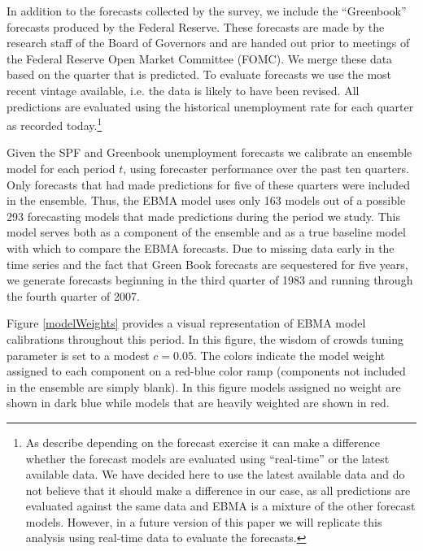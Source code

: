\documentclass[12pt,fullpage,endnotes]{article}
\begin{document}
In addition to the forecasts collected by the survey, we include the ``Greenbook'' forecasts produced by the Federal Reserve. These forecasts are made by the research staff of the Board of Governors and are handed out prior to meetings of the Federal Reserve Open Market Committee (FOMC). We merge these data based on the quarter that is predicted. To evaluate forecasts we use the most recent vintage available, i.e. the data is likely to have been revised. All predictions are evaluated using the historical unemployment rate for each quarter as recorded today.\footnote{As \citet{Croushore:Stark:2001} describe depending on the forecast exercise it can make a difference whether the forecast models are evaluated using ``real-time'' or the latest available data. We have decided here to use the latest available data and do not believe that it should make a difference in our case, as all predictions are evaluated against the same data and EBMA is a mixture of the other forecast models. However, in a future version of this paper we will replicate this analysis using real-time data to evaluate the forecasts.}

Given the SPF and Greenbook unemployment forecasts we calibrate an ensemble model for each period $t$, using forecaster
performance over the past ten quarters.  Only forecasts that had made
predictions for five of these quarters were included in the ensemble.
Thus, the EBMA model uses only 163 models out of a possible 293
forecasting models that made predictions during the period we study.
  This model serves both as a component of the ensemble and as a true baseline %
model with which to compare the EBMA forecasts. Due to missing data
early in the time series and the fact that Green Book forecasts are
sequestered for five years, we generate forecasts beginning in the
third quarter of 1983 and running through the fourth quarter of 2007.


Figure \ref{modelWeights} provides a visual representation of EBMA
model calibrations throughout this period.  In this figure, the wisdom
of crowds tuning parameter is set to a modest $c=0.05$.  The colors
indicate the model weight assigned to each component on a red-blue
color ramp (components not included in the ensemble are simply blank).  In this figure
models assigned no weight are shown in dark blue while models that are
heavily weighted are shown in red.
\end{document}
